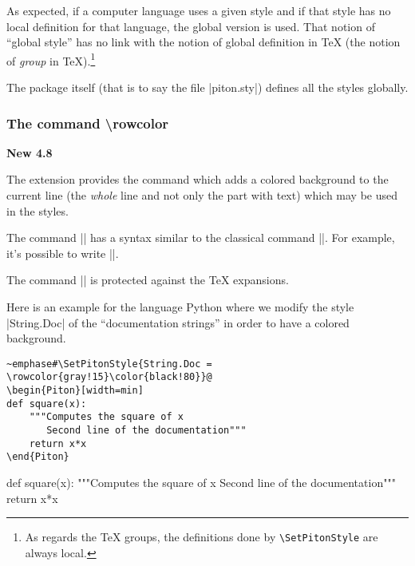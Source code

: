 \documentclass{article}
\begin{document}
\bigskip
As expected, if a computer language uses a given style and if that style has
no local definition for that language, the global version is used. That notion
of ``global style'' has no link with the notion of global definition in TeX
(the notion of \emph{group} in TeX).\footnote{As regards the TeX groups, the
definitions done by \texttt{\textbackslash SetPitonStyle} are always local.}

\bigskip
The package  itself (that is to say the file |piton.sty|) defines
all the styles globally. 

\bigskip

\bigskip
\subsubsection{The command \textbackslash rowcolor}

\label{rowcolor}

\colorbox{yellow!50}{\textbf{New 4.8}}

\nobreak
\medskip
The extension  provides the command  which adds
a colored background to the current line (the \emph{whole} line and not only the part with
text) which may be used in the styles.

\smallskip
The command |\rowcolor| has a syntax similar to the classical command |\color|. For example,
it's possible to write ||.

\smallskip
The command |\rowcolor| is protected against the TeX expansions.

\smallskip
Here is an example for the language Python where we modify the style |String.Doc|
of the ``documentation strings'' in order to have a colored background.


\begin{Verbatim}
~emphase#\SetPitonStyle{String.Doc = \rowcolor{gray!15}\color{black!80}}@
\begin{Piton}[width=min]
def square(x):
    """Computes the square of x
       Second line of the documentation"""
    return x*x
\end{Piton}
\end{Verbatim}


\bigskip
\begingroup
{}
\begin{Piton}[width=min]
def square(x):
    """Computes the square of x
       Second line of the documentation"""
    return x*x
\end{Piton}
\endgroup
\end{document}
